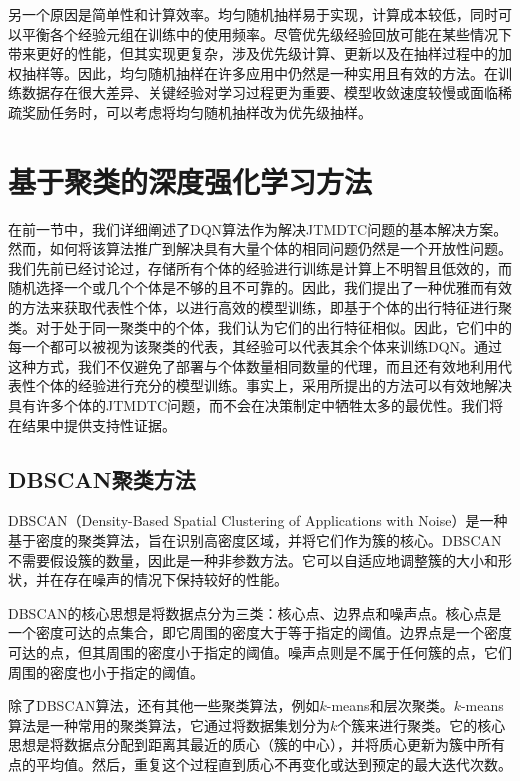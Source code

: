 另一个原因是简单性和计算效率。均匀随机抽样易于实现，计算成本较低，同时可以平衡各个经验元组在训练中的使用频率。尽管优先级经验回放可能在某些情况下带来更好的性能，但其实现更复杂，涉及优先级计算、更新以及在抽样过程中的加权抽样等。因此，均匀随机抽样在许多应用中仍然是一种实用且有效的方法。在训练数据存在很大差异、关键经验对学习过程更为重要、模型收敛速度较慢或面临稀疏奖励任务时，可以考虑将均匀随机抽样改为优先级抽样。

\section{基于聚类的深度强化学习方法}

在前一节中，我们详细阐述了DQN算法作为解决JTMDTC问题的基本解决方案。然而，如何将该算法推广到解决具有大量个体的相同问题仍然是一个开放性问题。我们先前已经讨论过，存储所有个体的经验进行训练是计算上不明智且低效的，而随机选择一个或几个个体是不够的且不可靠的。因此，我们提出了一种优雅而有效的方法来获取代表性个体，以进行高效的模型训练，即基于个体的出行特征进行聚类。对于处于同一聚类中的个体，我们认为它们的出行特征相似。因此，它们中的每一个都可以被视为该聚类的代表，其经验可以代表其余个体来训练DQN。通过这种方式，我们不仅避免了部署与个体数量相同数量的代理，而且还有效地利用代表性个体的经验进行充分的模型训练。事实上，采用所提出的方法可以有效地解决具有许多个体的JTMDTC问题，而不会在决策制定中牺牲太多的最优性。我们将在结果中提供支持性证据。



\subsection{DBSCAN聚类方法}
DBSCAN（Density-Based Spatial Clustering of Applications with Noise）是一种基于密度的聚类算法，旨在识别高密度区域，并将它们作为簇的核心。DBSCAN不需要假设簇的数量，因此是一种非参数方法。它可以自适应地调整簇的大小和形状，并在存在噪声的情况下保持较好的性能。

DBSCAN的核心思想是将数据点分为三类：核心点、边界点和噪声点。核心点是一个密度可达的点集合，即它周围的密度大于等于指定的阈值。边界点是一个密度可达的点，但其周围的密度小于指定的阈值。噪声点则是不属于任何簇的点，它们周围的密度也小于指定的阈值。

除了DBSCAN算法，还有其他一些聚类算法，例如$k$-means和层次聚类。$k$-means算法是一种常用的聚类算法，它通过将数据集划分为$k$个簇来进行聚类。它的核心思想是将数据点分配到距离其最近的质心（簇的中心），并将质心更新为簇中所有点的平均值。然后，重复这个过程直到质心不再变化或达到预定的最大迭代次数。

